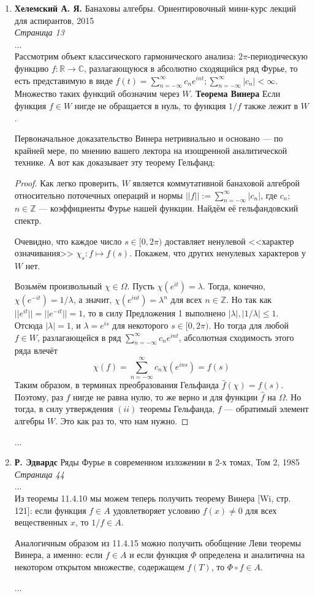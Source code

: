 \documentclass[12pt]{extarticle}
\theoremstyle{definition}
\begin{document}
    	\begin{enumerate}
			\item \textbf{Хелемский А. Я.} Банаховы алгебры. Ориентировочный мини-курс лекций для аспирантов, 2015\\
			\textit{Страница 13}\\
			...\\
			Рассмотрим объект классического гармонического анализа: $2\pi$-периодическую функцию $f:\mathbb{R}\rightarrow\mathbb{C}$, разлагающуюся в абсолютно сходящийся ряд Фурье, то есть представимую в виде $f(t)=\sum_{n=-\infty}^\infty c_n e^{int}; \sum_{n=-\infty}^\infty |c_n|<\infty$. Множество таких функций обозначим через $W$.
			\textbf{Теорема Винера}
				Если функция $f\in W$ нигде не обращается в нуль, то функция $1/f$ также лежит в $W$.
				
				Первоначальное доказательство Винера нетривиально и основано — по крайней мере, по мнению вашего лектора на изощренной аналитической технике. А вот как доказывает эту теорему Гельфанд:
			\begin{proof}
				Как легко проверить, $W$ является коммутативной банаховой алгеброй относительно поточечных операций и нормы $||f||:=\sum_{n=-\infty}^\infty |c_n|$, где $c_n$;$n\in\mathbb{Z}$ — коэффициенты Фурье нашей функции. Найдём её гельфандовский спектр. 
				
				Очевидно, что каждое число $s\in[0,2\pi)$ доставляет ненулевой <<характер означивания>> $\chi_s:f\mapsto f(s)$. Покажем, что других ненулевых характеров у $W$ нет.
				
				Возьмём произвольный $\chi\in\Omega$. Пусть $\chi(e^{it})=\lambda$. Тогда, конечно, $\chi(e^{-it})=1/\lambda$, а значит, $\chi(e^{int})=\lambda^n$ для всех $n\in\mathbb{Z}$. Но так как $||e^{it}||=||e^{-it}||=1$, то в силу Предложения 1 выполнено $|\lambda|,|1/\lambda|\leq1$. Отсюда $|\lambda|=1$, и $\lambda=e^{is}$ для некоторого $s\in[0,2\pi)$. Но тогда для любой $f\in W$, разлагающейся в ряд $\sum_{n=-\infty}^\infty c_n e^{int}$, абсолютная сходимость этого ряда влечёт 
				$$\chi(f)=\sum_{n=-\infty}^\infty c_n \chi(e^{ins})=f(s)$$
				Таким образом, в терминах преобразования Гельфанда $\hat{f}(\chi)=f(s)$. Поэтому, раз $f$ нигде не равна нулю, то же верно и для функции $\hat{f}$ на $\Omega$. Но тогда, в силу утверждения $(ii)$ теоремы Гельфанда, $f$ — обратимый элемент алгебры $W$. Это как раз то, что нам нужно.	
			\end{proof}
		...
		\item \textbf{Р. Эдвардс} Ряды Фурье в современном изложении в 2-х томах, Том 2, 1985\\
		\textit{Страница 44}\\
		...\\
		Из теоремы 11.4.10 мы можем теперь получить теорему Винера [Wi, стр. 121]: если функция $f\in A$ удовлетворяет условию $f(x)\neq 0$ для всех вещественных $x$, то $1/f\in A$. 
		
		Аналогичным образом из 11.4.15 можно получить обобщение Леви теоремы Винера, а именно: если $f\in A$ и если функция $\Phi$ определена и аналитична на некотором открытом множестве, содержащем $f(T)$, то $\Phi\circ f\in A$.
		
		...
	\end{enumerate}
\end{document}
